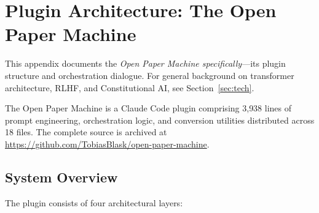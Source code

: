 
\appendix

\section{Plugin Architecture: The Open Paper Machine}
\label{app:plugin}

This appendix documents the \textit{Open Paper Machine specifically}---its plugin structure and orchestration dialogue. For general background on transformer architecture, RLHF, and Constitutional AI, see Section~\ref{sec:tech}.

The Open Paper Machine is a Claude Code plugin comprising 3{,}938 lines of prompt engineering, orchestration logic, and conversion utilities distributed across 18 files. The complete source is archived at \url{https://github.com/TobiasBlask/open-paper-machine}.

\subsection{System Overview}

The plugin consists of four architectural layers:

